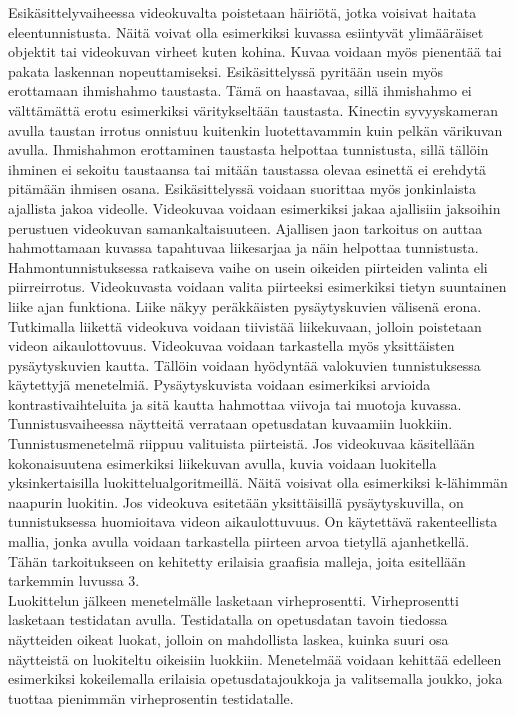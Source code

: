 Esikäsittelyvaiheessa videokuvalta poistetaan häiriötä, jotka voisivat haitata eleentunnistusta.
Näitä voivat olla esimerkiksi kuvassa esiintyvät ylimääräiset objektit tai videokuvan virheet kuten kohina.
Kuvaa voidaan myös pienentää tai pakata laskennan nopeuttamiseksi. Esikäsittelyssä pyritään usein myös erottamaan ihmishahmo taustasta. Tämä on haastavaa, sillä
ihmishahmo ei välttämättä erotu esimerkiksi väritykseltään taustasta. Kinectin syvyyskameran avulla taustan irrotus onnistuu kuitenkin luotettavammin kuin pelkän 
värikuvan avulla. Ihmishahmon erottaminen taustasta helpottaa tunnistusta, sillä tällöin ihminen ei sekoitu taustaansa tai mitään taustassa olevaa
esinettä ei erehdytä pitämään ihmisen osana. Esikäsittelyssä voidaan suorittaa myös jonkinlaista ajallista jakoa videolle. Videokuvaa
voidaan esimerkiksi jakaa ajallisiin jaksoihin perustuen videokuvan samankaltaisuuteen. Ajallisen jaon 
tarkoitus on auttaa hahmottamaan kuvassa tapahtuvaa liikesarjaa ja näin helpottaa tunnistusta. \citep{6239178} \\

Hahmontunnistuksessa ratkaiseva vaihe on usein oikeiden piirteiden valinta eli piirreirrotus. Videokuvasta voidaan valita piirteeksi esimerkiksi 
tietyn suuntainen liike ajan funktiona. Liike näkyy peräkkäisten pysäytyskuvien välisenä erona. Tutkimalla liikettä
videokuva voidaan tiivistää liikekuvaan, jolloin poistetaan videon aikaulottovuus. Videokuvaa voidaan tarkastella myös yksittäisten pysäytyskuvien kautta. 
Tällöin voidaan hyödyntää valokuvien tunnistuksessa käytettyjä menetelmiä.
Pysäytyskuvista voidaan esimerkiksi arvioida kontrastivaihteluita ja sitä kautta hahmottaa viivoja tai muotoja kuvassa. \citep{6239178}  \\

Tunnistusvaiheessa näytteitä verrataan opetusdatan kuvaamiin luokkiin. Tunnistusmenetelmä riippuu valituista piirteistä.
Jos videokuvaa käsitellään kokonaisuutena esimerkiksi liikekuvan avulla, kuvia voidaan luokitella yksinkertaisilla luokittelualgoritmeillä. 
Näitä voisivat olla esimerkiksi k-lähimmän naapurin luokitin. Jos videokuva esitetään yksittäisillä pysäytyskuvilla, 
on tunnistuksessa huomioitava videon aikaulottuvuus. On käytettävä rakenteellista mallia, jonka avulla voidaan tarkastella piirteen arvoa
tietyllä ajanhetkellä. Tähän tarkoitukseen on kehitetty erilaisia graafisia malleja, joita esitellään tarkemmin luvussa 3. \citep{6239178} \\

Luokittelun jälkeen menetelmälle lasketaan virheprosentti. Virheprosentti lasketaan testidatan avulla.
Testidatalla on opetusdatan tavoin tiedossa näytteiden oikeat luokat, jolloin on mahdollista laskea, kuinka suuri osa
näytteistä on luokiteltu oikeisiin luokkiin. Menetelmää voidaan kehittää edelleen esimerkiksi kokeilemalla erilaisia
opetusdatajoukkoja ja valitsemalla joukko, joka tuottaa pienimmän virheprosentin testidatalle. \citep{6239178} 


